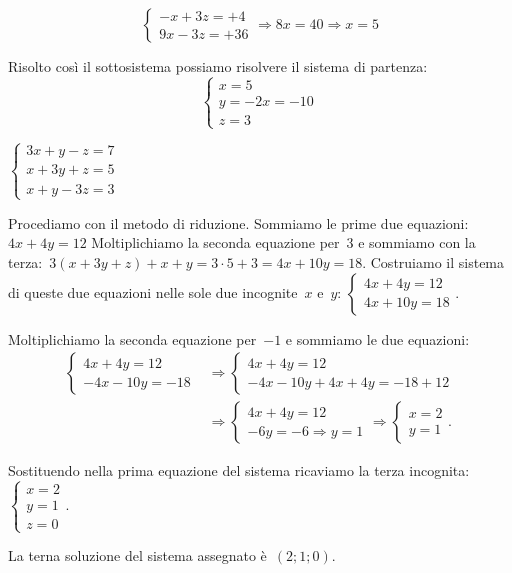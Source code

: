 \begin{soluzione}
\[\left\{\begin{array}{l}
  -x+3z=+4\\
  9x-3z=+36
\end{array}\right.
\Rightarrow 8x=40 \Rightarrow x=5
\]

Risolto così il sottosistema possiamo risolvere il sistema di partenza:
\[\left\{\begin{array}{l}
  x=5\\
  y=-2x=-10\\
  z=3
\end{array}\right.\]

\end{soluzione}

\begin{exrig}
 \begin{esempio}
$\left\{\begin{array}{l}3x+y-z=7\\x+3y+z=5\\x+y-3z=3\end{array}\right.$

Procediamo con il metodo di riduzione. Sommiamo le prime due 
equazioni:~$4x+4y=12$
Moltiplichiamo la seconda equazione per~3 e sommiamo con la 
terza:~$3(x+3y+z)+x+y=3\cdot 5+3=4x+10y=18$.
Costruiamo il sistema di queste due equazioni
nelle sole due incognite~$x$ e~$y$:
$\left\{\begin{array}{l}4x+4y=12\\4x+10y=18\end{array}\right..$

Moltiplichiamo la seconda equazione per~$-1$ e sommiamo le due equazioni:
\begin{align*}
\left\{\begin{array}{l}4x+4y=12 \\-4x-10y=-18
\end{array}\right.&\Rightarrow
\left\{\begin{array}{l}4x+4y=12
\\-4x-10y+4x+4y=-18+12 \end{array}\right.\\
&\Rightarrow
\left\{\begin{array}{l}4x+4y=12 \\-6y=-6\Rightarrow
y=1 \end{array}\right.\Rightarrow
\left\{\begin{array}{l}x=2 \\y=1
\end{array}\right..
\end{align*}

Sostituendo nella prima equazione del sistema ricaviamo la terza
incognita:~$\left\{\begin{array}{l}x=2\\y=1\\z=0\end{array}\right.$.

La terna soluzione del sistema assegnato è~$(2;1;0)$.
 \end{esempio}
\end{exrig}

